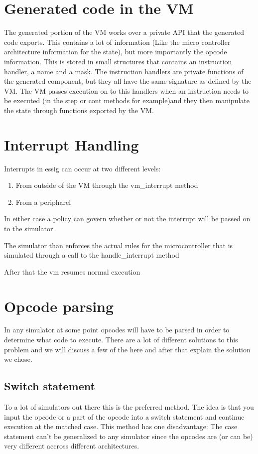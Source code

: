 \documentclass[a4paper]{report}
\begin{document}
\section{Generated code in the VM}
The generated portion of the VM works over a private API that the
generated code exports. This contains a lot of information (Like the
micro controller architecture information for the state), but more
importantly the opcode information. This is stored in small structures
that contains an instruction handler, a name and a mask. The
instruction handlers are private functions of the generated component,
but they all have the same signature as defined by the VM. The VM
passes execution on to this handlers when an instruction needs to be
executed (in the step or cont methods for example)and they then
manipulate the state through functions exported by the VM.

\section[Interrupt Handling]{Interrupt Handling}
Interrupts in essig can occur at two different levels:

\begin{enumerate}
\item {
From outside of the VM through the vm\_interrupt method }
\item {
From a peripharel }
\end{enumerate}
In either case a policy can govern whether or not the interrupt will be
passed on to the simulator

The simulator than enforces the actual rules for the microcontroller
that is simulated through a call to the handle\_interrupt method

After that the vm resumes normal execution
\section[Opcode parsing]{Opcode parsing}
In any simulator at some point opcodes will have to be parsed in order
to determine what code to execute. There are a lot of different
solutions to this problem and we will discuss a few of the here and
after that explain the solution we chose.

\subsection[Switch statement]{Switch statement}
To a lot of simulators out there this is the preferred method. The idea
is that you input the opcode or a part of the opcode into a switch
statement and continue execution at the matched case. This method has
one disadvantage: The case statement can't be generalized to any
simulator since the opcodes are (or can be) very different accross
different architectures.
\end{document}
